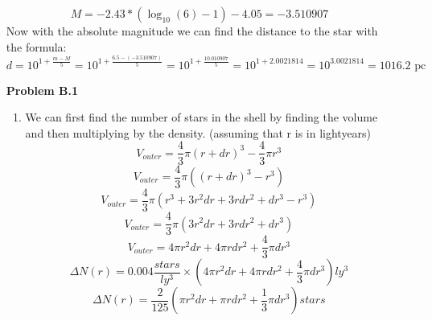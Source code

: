 \documentclass{article}
\theoremstyle{plain}
\begin{document}
\begin{enumerate}
          \[
              M = -2.43 * (\log_{10}(6)-1) -4.05 = -3.510907
          \]
          Now with the absolute magnitude we can find the distance to the star with the formula:
          \[
              d = 10^{1 + \frac{m - M}{5}} = 10^{1 + \frac{6.5 - (-3.510907)}{5}} = 10^{1 + \frac{10.010907}{5}} = 10^{1 + 2.0021814} = 10^{3.0021814} = 1016.2 \text{ pc}
          \]
    \item[\textbf{Problem B.1}]
          \begin{enumerate}[label=(\alph*)]
              \item We can first find the number of stars in the shell by finding the volume and then multiplying by the density. (assuming that r is in lightyears)
                    \begin{equation*}
                        V_{outer} = \frac{4}{3}\pi (r+dr)^3 - \frac{4}{3}\pi r^3
                    \end{equation*}
                    \begin{equation*}
                        V_{outer} = \frac{4}{3}\pi ((r+dr)^3 - r^3)
                    \end{equation*}
                    \begin{equation*}
                        V_{outer} = \frac{4}{3}\pi (r^3 + 3r^2dr + 3rdr^2 + dr^3 - r^3)
                    \end{equation*}
                    \begin{equation*}
                        V_{outer} = \frac{4}{3}\pi (3r^2dr + 3rdr^2 + dr^3)
                    \end{equation*}
                    \begin{equation*}
                        V_{outer} = 4\pi r^2dr + 4\pi rdr^2 + \frac{4}{3}\pi dr^3
                    \end{equation*}
                    \begin{equation*}
                        \Delta N(r) = 0.004 \frac{stars}{ly^3} \times (4\pi r^2dr + 4\pi rdr^2 + \frac{4}{3}\pi dr^3) ly^3
                    \end{equation*}
                    \begin{equation*}
                        \Delta N(r) = \frac{2}{125}(\pi r^2dr + \pi rdr^2 + \frac{1}{3}\pi dr^3) stars
                    \end{equation*}


\end{enumerate}
\end{enumerate}
\end{document}
